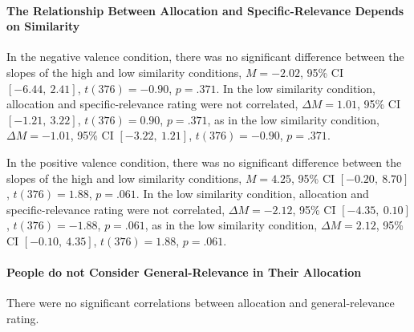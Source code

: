 \documentclass[a4paper, nobind]{templates/ociamthesis}
\newcommand*{\bibtitle}{References}
\theoremstyle{definition}
\theoremstyle{definition}
\theoremstyle{definition}
\theoremstyle{definition}
\theoremstyle{remark}
\begin{document}
\paragraph{The Relationship Between Allocation and Specific-Relevance Depends on Similarity}

In the negative valence condition, there was no significant difference between
the slopes of the high and low similarity conditions,
\(M = -2.02\), 95\% CI \([-6.44,~2.41]\), \(t(376) = -0.90\), \(p = .371\).
In the low similarity condition, allocation and specific-relevance rating were
not correlated,
\(\Delta M = 1.01\), 95\% CI \([-1.21,~3.22]\), \(t(376) = 0.90\), \(p = .371\),
as in the low similarity condition,
\(\Delta M = -1.01\), 95\% CI \([-3.22,~1.21]\), \(t(376) = -0.90\), \(p = .371\).

In the positive valence condition, there was no significant difference between
the slopes of the high and low similarity conditions,
\(M = 4.25\), 95\% CI \([-0.20,~8.70]\), \(t(376) = 1.88\), \(p = .061\).
In the low similarity condition, allocation and specific-relevance rating were
not correlated,
\(\Delta M = -2.12\), 95\% CI \([-4.35,~0.10]\), \(t(376) = -1.88\), \(p = .061\),
as in the low similarity condition,
\(\Delta M = 2.12\), 95\% CI \([-0.10,~4.35]\), \(t(376) = 1.88\), \(p = .061\).

\paragraph{People do not Consider General-Relevance in Their Allocation}

There were no significant correlations between allocation and general-relevance
rating.


\setlength{\baselineskip}{0pt} %

{\renewcommand*\MakeUppercase[1]{#1}%
\printbibliography[heading=bibintoc,title={\bibtitle}]}
\end{document}
